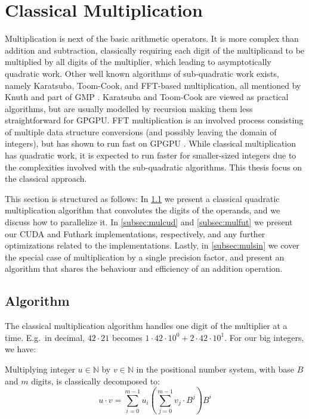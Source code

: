 \section{Classical Multiplication}
\label{sec:mul}

Multiplication is next of the basic arithmetic operators. It is more complex
than addition and subtraction, classically requiring each digit of the
multiplicand to be multiplied by all digits of the multiplier, which leading to
asymptotically quadratic work. Other well known algorithms of sub-quadratic work
exists, namely Karatsuba, Toom-Cook, and FFT-based multiplication, all mentioned
by Knuth and part of GMP \cite{GMP,knuth97}. Karatsuba and Toom-Cook are viewed
as practical algorithms, but are usually modelled by recursion making them less
straightforward for GPGPU. FFT multiplication is an involved process consisting
of multiple data structure conversions (and possibly leaving the domain of
integers), but has shown to run fast on GPGPU \cite{Bantikyan2014BigIM,
  oancea2024gpu}. While classical multiplication has quadratic work, it is
expected to run faster for smaller-sized integers due to the complexities
involved with the sub-quadratic algorithms. This thesis focus on the classical
approach.

This section is structured as follows: In \ref{subsec:mulalg} we present a
classical quadratic multiplication algorithm that convolutes the digits of the
operands, and we discuss how to parallelize it. In \ref{subsec:mulcud} and
\ref{subsec:mulfut} we present our CUDA and Futhark implementations,
respectively, and any further optimizations related to the
implementations. Lastly, in \ref{subsec:mulsin} we cover the special case
of multiplication by a single precision factor, and present an algorithm that
shares the behaviour and efficiency of an addition operation.

\subsection{Algorithm}
\label{subsec:mulalg}

The classical multiplication algorithm handles one digit of the multiplier at a
time. E.g.\ in decimal, $42\cdot 21$ becomes
$1 \cdot 42 \cdot 10^{0} + 2 \cdot 42 \cdot 10^{1}$. For our big integers, we have:

\begin{definition}\label{def:clasmul}
  Multiplying integer $u\in \mathbb{N}$ by $v \in \mathbb{N}$ in the positional number system, with
  base $B$ and $m$ digits, is classically decomposed to:
\begin{equation}
  \label{eq:clasmul0}
  u \cdot v = \sum_{i=0}^{m-1}u_i\left( \sum_{j=0}^{m-1}v_j\cdot B^{j} \right)B^{i}
\end{equation}
\end{definition}

